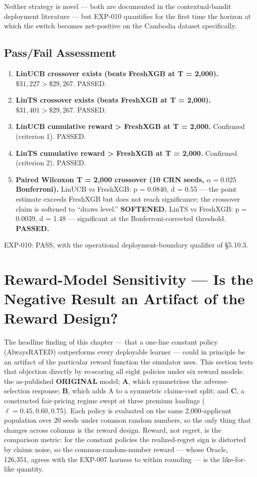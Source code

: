 Neither strategy is novel --- both are documented in the contextual-bandit deployment literature --- but EXP-010 quantifies for the first time the horizon at which the switch becomes net-positive on the Cambodia dataset specifically.

\subsection{Pass/Fail Assessment}\label{passfail-assessment-7}

\begin{enumerate}
\def\labelenumi{\arabic{enumi}.}
\tightlist
\item
  \textbf{LinUCB crossover exists (beats FreshXGB at T = 2,000).} \(\$31{,}227 > \$29{,}267\). PASSED.
\item
  \textbf{LinTS crossover exists (beats FreshXGB at T = 2,000).} \(\$31{,}401 > \$29{,}267\). PASSED.
\item
  \textbf{LinUCB cumulative reward \textgreater{} FreshXGB at T = 2,000.} Confirmed (criterion 1). PASSED.
\item
  \textbf{LinTS cumulative reward \textgreater{} FreshXGB at T = 2,000.} Confirmed (criterion 2). PASSED.
\item
  \textbf{Paired Wilcoxon T = 2,000 crossover (10 CRN seeds, \(\alpha = 0.025\) Bonferroni).}
  LinUCB vs FreshXGB: p = 0.0840, d = 0.55 --- the point estimate exceeds FreshXGB but does not reach significance; the crossover claim is softened to ``draws level.'' \textbf{SOFTENED.}
  LinTS vs FreshXGB: p = 0.0039, d = 1.48 --- significant at the Bonferroni-corrected threshold. \textbf{PASSED.}
\end{enumerate}

EXP-010: PASS, with the operational deployment-boundary qualifier of §5.10.3.

\section{Reward-Model Sensitivity --- Is the Negative Result an Artifact of the Reward Design?}\label{reward-model-sensitivity}

The headline finding of this chapter --- that a one-line constant policy (AlwaysRATED) outperforms every deployable learner --- could in principle be an artifact of the particular reward function the simulator uses. This section tests that objection directly by re-scoring all eight policies under six reward models: the as-published \textbf{ORIGINAL} model; \textbf{A}, which symmetrises the adverse-selection response; \textbf{B}, which adds A to a symmetric claims-cost split; and \textbf{C}, a constructed fair-pricing regime swept at three premium loadings (\(\ell = 0.45, 0.60, 0.75\)). Each policy is evaluated on the same 2,000-applicant population over 20 seeds under common random numbers, so the only thing that changes across columns is the reward design. Reward, not regret, is the comparison metric: for the constant policies the realized-regret sign is distorted by claims noise, so the common-random-number reward --- whose Oracle, 126,351, agrees with the EXP-007 harness to within rounding --- is the like-for-like quantity.

